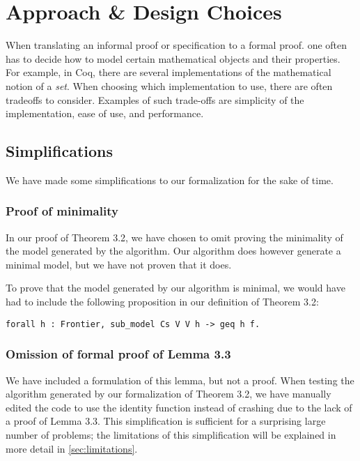 \chapter{Approach \& Design Choices}

When translating an informal proof or specification to a formal proof.
one often has to decide how to model certain mathematical objects and their properties.
For example, in Coq, there are several implementations of the mathematical notion of a \textit{set}.
When choosing which implementation to use, there are often tradeoffs to consider.
Examples of such trade-offs are simplicity of the implementation, ease of use, and performance.

\section{Simplifications}

We have made some simplifications to our formalization for the sake of time.

\subsection{Proof of minimality}

In our proof of Theorem 3.2, we have chosen to omit proving the minimality of the model generated by the algorithm.
Our algorithm does however generate a minimal model, but we have not proven
that it does.

To prove that the model generated by our algorithm is minimal,
we would have had to include the following proposition in our definition of Theorem 3.2:

\begin{minipage}{\linewidth}
\begin{lstlisting}[language=Coq, label={lst:minimal_model}, caption={Proposition for minimal model}]
forall h : Frontier, sub_model Cs V V h -> geq h f.
\end{lstlisting}
\end{minipage}

\subsection{Omission of formal proof of Lemma 3.3}

We have included a formulation of this lemma, but not a proof.
When testing the algorithm generated by our formalization of Theorem 3.2,
we have manually edited the code to use the identity function instead of crashing due to
the lack of a proof of Lemma 3.3.
This simplification is sufficient for a surprising large number of problems;
the limitations of this simplification will be explained in more detail in \autoref{sec:limitations}.

